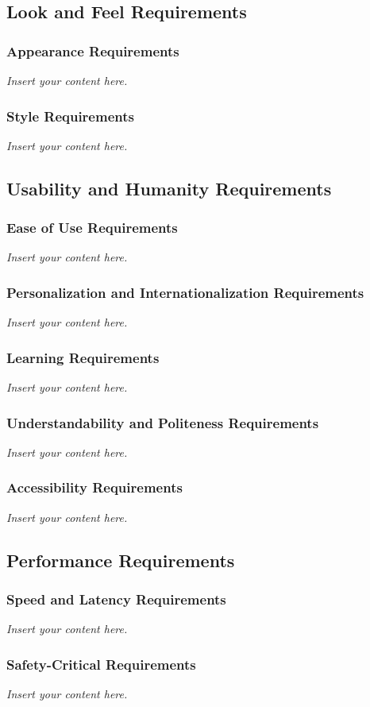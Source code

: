 \documentclass[12pt]{article}
\newcommand{\lips}{\textit{Insert your content here.}}
\begin{document}
\subsection{Look and Feel Requirements}
\subsubsection{Appearance Requirements}
\lips
\subsubsection{Style Requirements}
\lips

\subsection{Usability and Humanity Requirements}
\subsubsection{Ease of Use Requirements}
\lips
\subsubsection{Personalization and Internationalization Requirements}
\lips
\subsubsection{Learning Requirements}
\lips
\subsubsection{Understandability and Politeness Requirements}
\lips
\subsubsection{Accessibility Requirements}
\lips

\subsection{Performance Requirements}
\subsubsection{Speed and Latency Requirements}
\lips
\subsubsection{Safety-Critical Requirements}
\lips
\end{document}
